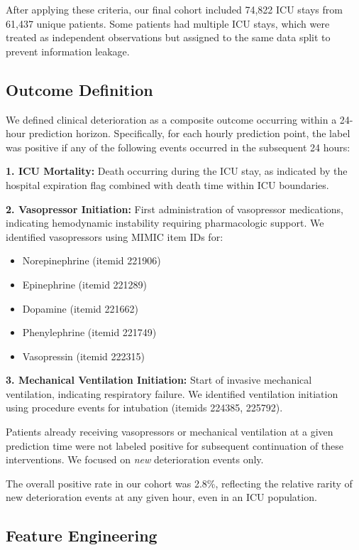 After applying these criteria, our final cohort included 74,822 ICU stays from 61,437 unique patients. Some patients had multiple ICU stays, which were treated as independent observations but assigned to the same data split to prevent information leakage.

\subsection{Outcome Definition}

We defined clinical deterioration as a composite outcome occurring within a 24-hour prediction horizon. Specifically, for each hourly prediction point, the label was positive if any of the following events occurred in the subsequent 24 hours:

\textbf{1. ICU Mortality:} Death occurring during the ICU stay, as indicated by the hospital expiration flag combined with death time within ICU boundaries.

\textbf{2. Vasopressor Initiation:} First administration of vasopressor medications, indicating hemodynamic instability requiring pharmacologic support. We identified vasopressors using MIMIC item IDs for:
\begin{itemize}
    \item Norepinephrine (itemid 221906)
    \item Epinephrine (itemid 221289)
    \item Dopamine (itemid 221662)
    \item Phenylephrine (itemid 221749)
    \item Vasopressin (itemid 222315)
\end{itemize}

\textbf{3. Mechanical Ventilation Initiation:} Start of invasive mechanical ventilation, indicating respiratory failure. We identified ventilation initiation using procedure events for intubation (itemids 224385, 225792).

Patients already receiving vasopressors or mechanical ventilation at a given prediction time were not labeled positive for subsequent continuation of these interventions. We focused on \textit{new} deterioration events only.

The overall positive rate in our cohort was 2.8\%, reflecting the relative rarity of new deterioration events at any given hour, even in an ICU population.

\subsection{Feature Engineering}


